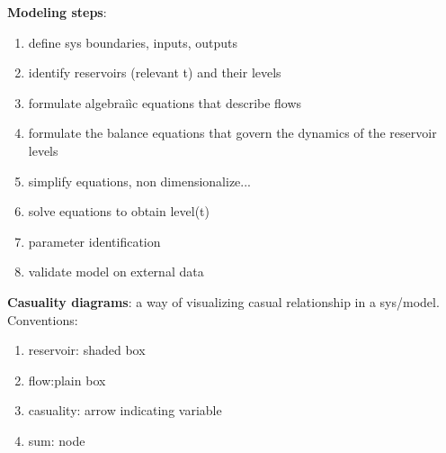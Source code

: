 \textbf{Modeling steps}:
\begin{enumerate}[label=$\bullet$]
	\item define sys boundaries, inputs,       	outputs
	\item identify reservoirs (relevant t) and 
	their levels
	\item formulate algebraiìc equations that 		describe flows
	\item formulate the balance equations
	that govern the dynamics of the reservoir 		levels
	\item simplify equations, non dimensionalize...
	\item solve equations to obtain level(t)
	\item parameter identification
	\item validate model on external data
\end{enumerate}

\textbf{Casuality diagrams}: a way of visualizing casual relationship in a sys/model. 
Conventions: 
\begin{enumerate}[label=$\bullet$]
	\item reservoir: shaded box
	\item flow:plain box
	\item casuality: arrow indicating variable
	\item sum: node
\end{enumerate}

